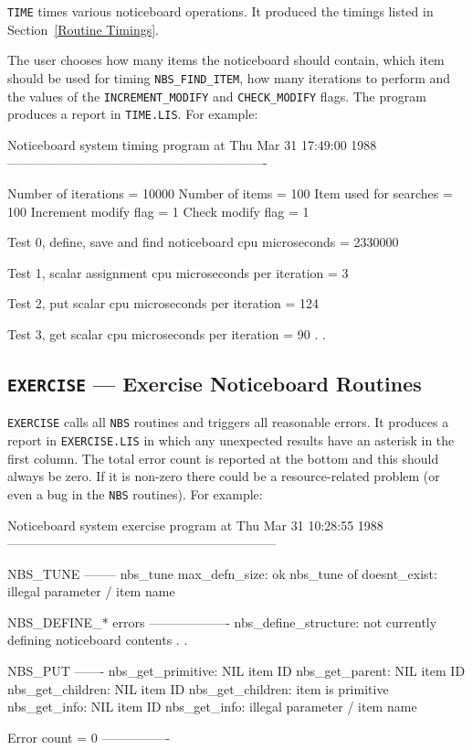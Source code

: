 \documentclass[twoside,11pt,nolof]{starlink}
\begin{document}
\texttt{TIME} times various noticeboard operations. It produced the timings listed
in Section~\ref {Routine Timings}.

The user chooses how many items the noticeboard should contain, which item
should be used for timing \texttt{NBS\_FIND\_ITEM}, how many iterations to perform
and the values of the \texttt{INC\-RE\-MENT\_\-MOD\-IFY} and \texttt{CHECK\_\-MOD\-IFY} flags. The program produces a report in \texttt{TIME.LIS}. For
example:

\begin{terminalv}
Noticeboard system timing program at Thu Mar 31 17:49:00 1988
-------------------------------------------------------------

Number of iterations   = 10000
Number of items        = 100
Item used for searches = 100
Increment modify flag  = 1
Check modify flag      = 1

Test 0, define, save and find noticeboard
       cpu microseconds = 2330000

Test 1, scalar assignment
       cpu microseconds per iteration = 3

Test 2, put scalar
       cpu microseconds per iteration = 124

Test 3, get scalar
       cpu microseconds per iteration = 90
.
.
\end{terminalv}

\subsection {\texttt{EXERCISE} --- Exercise Noticeboard Routines}

\texttt{EXERCISE} calls all \texttt{NBS} routines and triggers all reasonable
errors. It produces a report in \texttt{EXERCISE.LIS} in which any unexpected
results have an asterisk in the first column. The total error count is reported
at the bottom and this should always be zero. If it is non-zero there could
be a resource-related problem (or even a bug in the \texttt{NBS} routines).
For example:

\begin{terminalv}
Noticeboard system exercise program at Thu Mar 31 10:28:55 1988
---------------------------------------------------------------

NBS_TUNE
--------
nbs_tune max_defn_size: ok
nbs_tune of doesnt_exist: illegal parameter / item name

NBS_DEFINE_* errors
-------------------
nbs_define_structure: not currently defining noticeboard contents
.
.

NBS_PUT
-------
nbs_get_primitive: NIL item ID
nbs_get_parent: NIL item ID
nbs_get_children: NIL item ID
nbs_get_children: item is primitive
nbs_get_info: NIL item ID
nbs_get_info: illegal parameter / item name

Error count = 0
----------------
\end{terminalv}
\end{document}
